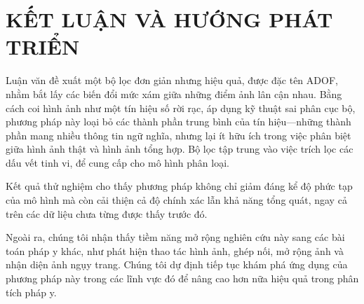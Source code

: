 \chapter{KẾT LUẬN VÀ HƯỚNG PHÁT TRIỂN}
\label{Chapter5}

Luận văn đề xuất một bộ lọc đơn giản nhưng hiệu quả, được đặc tên ADOF, nhằm bắt lấy các biến đổi mức xám giữa những điểm ảnh lân cận nhau. Bằng cách coi hình ảnh như một tín hiệu số rời rạc, áp dụng kỹ thuật sai phân cục bộ, phương pháp này loại bỏ các thành phần trung bình của tín hiệu—những thành phần mang nhiều thông tin ngữ nghĩa, nhưng lại ít hữu ích trong việc phân biệt giữa hình ảnh thật và hình ảnh tổng hợp. Bộ lọc tập trung vào việc trích lọc các dấu vết tinh vi, để cung cấp cho mô hình phân loại.

Kết quả thử nghiệm cho thấy phương pháp không chỉ giảm đáng kể độ phức tạp của mô hình mà còn cải thiện cả độ chính xác lẫn khả năng tổng quát, ngay cả trên các dữ liệu chưa từng được thấy trước đó.

Ngoài ra, chúng tôi nhận thấy tiềm năng mở rộng nghiên cứu này sang các bài toán pháp y khác, như phát hiện thao tác hình ảnh, ghép nối, mở rộng ảnh và nhận diện ảnh ngụy trang. Chúng tôi dự định tiếp tục khám phá ứng dụng của phương pháp này trong các lĩnh vực đó để nâng cao hơn nữa hiệu quả trong phân tích pháp y.